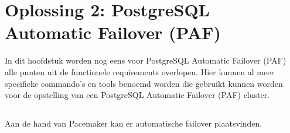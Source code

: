
\chapter{Oplossing 2: PostgreSQL Automatic Failover (PAF)}
\label{ch:Oplossing 2: PostgreSQL Automatic Failover}

In dit hoofdstuk worden nog eens voor PostgreSQL Automatic Failover (PAF) alle punten uit de functionele requirements overlopen. Hier kunnen al meer specifieke commando's en tools benoemd worden die gebruikt kunnen worden voor de opstelling van een PostgreSQL Automatic Failover (PAF) cluster.


\section{}
\label{sec:Redundantie/Replicatie}

\section{}
\label{sec:Failover}

Aan de hand van Pacemaker kan er automatische failover plaatsvinden.

\section{}
\label{sec:Monitoring}
